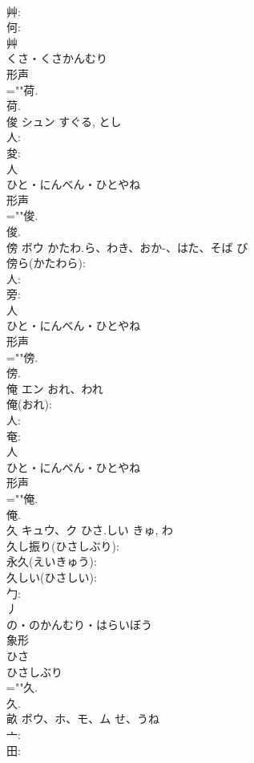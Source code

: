 \documentclass[8pt]{extreport}
\begin{document}
\begin{CJK}{UTF8}{min}
\\	艸: 
\\	何: 
\\	艸	
\\	くさ・くさかんむり	
\\	形声 
\\	=""荷.
\\	荷.
\\	俊	シュン		すぐる, とし	
\\	人: 
\\	夋: 
\\	人	
\\	ひと・にんべん・ひとやね	
\\	形声 
\\	=""俊.
\\	俊.
\\	傍	ボウ	かたわ.ら、わき、おか-、はた、そば	び	
\\	傍ら(かたわら): 
\\	人: 
\\	旁: 
\\	人	
\\	ひと・にんべん・ひとやね	
\\	形声 
\\	=""傍.
\\	傍.
\\	俺	エン	おれ、われ		
\\	俺(おれ): 
\\	人: 
\\	奄: 
\\	人	
\\	ひと・にんべん・ひとやね	
\\	形声 
\\	=""俺.
\\	俺.
\\	久	キュウ、ク	ひさ.しい	きゅ, わ	
\\	久し振り(ひさしぶり): 
\\	永久(えいきゅう): 
\\	久しい(ひさしい): 
\\	勹: 
\\	丿	
\\	の・のかんむり・はらいぼう	
\\	象形 
\\	ひさ 
\\	ひさしぶり 
\\	=""久.
\\	久.
\\	畝	ボウ、ホ、モ、ム	せ、うね		
\\	亠: 
\\	田: 

\end{CJK}
\end{document}
